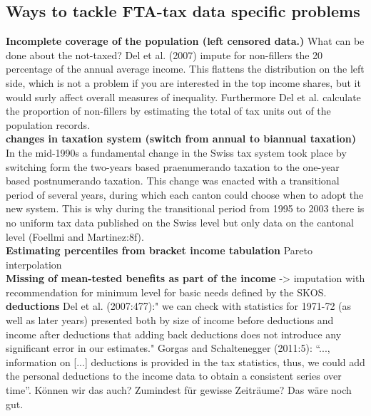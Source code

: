 \documentclass[twoside]{article}\usepackage[]{graphicx}\usepackage[]{color}
\begin{document}
\begin{multicols}{2}
\subsection{Ways to tackle FTA-tax data specific problems}

\textbf{Incomplete coverage of the population (left censored data.)} What can be done about the not-taxed? Del et al. (2007) impute for non-fillers the 20 percentage of the annual average income. This flattens the distribution on the left side, which is not a problem if you are interested in the top income shares, but it would surly affect overall measures of inequality. Furthermore Del et al. calculate the proportion of non-fillers by estimating the total of tax units out of the population records. \\

\textbf{changes in taxation system  (switch from annual to biannual taxation)} In the mid-1990s a fundamental change in the Swiss tax system took place by switching form the two-years based praenumerando taxation to the one-year based postnumerando taxation. This change was enacted with a transitional period of several years, during which each canton could choose when to adopt the new system.  This is why during the transitional period from 1995 to 2003 there is no uniform tax data published on the Swiss level but only data on the cantonal level  (Foellmi and Martinez:8f). \\

\textbf{Estimating percentiles from bracket income tabulation} Pareto interpolation \\ 

\textbf{Missing of mean-tested benefits as part of the income} -> imputation with recommendation for minimum level for basic needs defined by the SKOS.\\

\textbf{deductions} Del et al. (2007:477):" we can check with statistics for 1971-72 (as well as later years) presented both by size of income before deductions and income after deductions that adding back deductions does not introduce any significant error in our estimates."
Gorgas and Schaltenegger (2011:5): ``..., information on [...] deductions is provided in the tax statistics, thus, we could add the personal deductions to the income data to obtain a consistent series over time''. Können wir das auch? Zumindest für gewisse Zeiträume? Das wäre noch gut. \\


\end{multicols}
\end{document}
